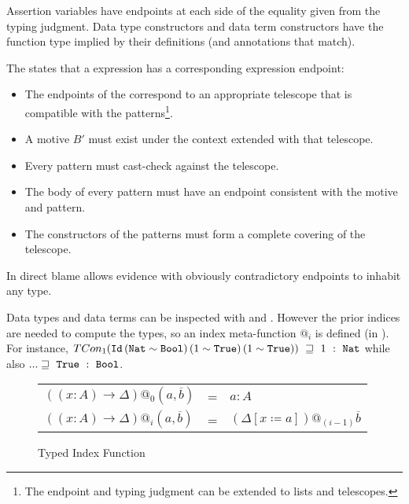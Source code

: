 
Assertion variables have endpoints at each side of the equality given from the typing judgment.
Data type constructors and data term constructors have the function type implied by their definitions (and annotations that match).

The  states that a \case{} expression has a corresponding \case{} expression endpoint:
\begin{itemize}
  \item The endpoints of the \scruts{} correspond to an appropriate telescope that is compatible with the patterns\footnote{
    The endpoint and typing judgment can be extended to lists and telescopes.
  }.
  \item A motive $B'$ must exist under the context extended with that telescope.
  \item Every pattern must cast-check against the telescope.
  \item The body of every pattern must have an endpoint consistent with the motive and pattern.
  \item The constructors of the patterns must form a complete covering of the telescope.
\end{itemize}
  
In  direct blame allows evidence with obviously contradictory endpoints to inhabit any type.

Data types and data terms can be inspected with  and .
However the prior indices are needed to compute the types, so an index meta-function $@_{i}$ is defined (in ).
For instance, $TCon_1 (\Id{}\, (\Nat{}\sim\Bool{})\,(1\sim\True{})\,(1\sim\True{}))\ \sqsupseteq\  1\ :\ \Nat{}$ while also  $... \sqsupseteq\  \mathtt{True}{}\ :\ \mathtt{Bool}{}$.

\begin{figure}

\begin{tabular}{lll}
  $\left(\left(x:A\right)\rightarrow\Delta\right)@_{0}\left(a,\overline{b}\right)$ & = & $a:A$\tabularnewline
  $\left(\left(x:A\right)\rightarrow\Delta\right)@_{i}\left(a,\overline{b}\right)$ & = & $\left(\Delta\left[x\coloneqq a\right]\right)@_{\left(i-1\right)}\overline{b}$\tabularnewline
\end{tabular}
\caption{Typed Index Function}
\label{fig:cast-Data-index-1}
\end{figure}